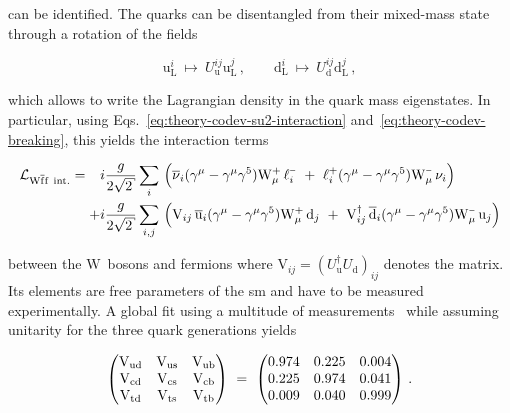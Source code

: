 can be identified. The quarks can be disentangled from their mixed-mass state through a rotation of the fields 

\begin{equation}
\mathrm{u}^{i}_\mathrm{L}~\mapsto~ U^{ij}_\mathrm{u}\mathrm{u}^{j}_\mathrm{L}\,,\qquad \mathrm{d}^{i}_\mathrm{L}~\mapsto~ U^{ij}_\mathrm{d}\mathrm{d}^{j}_\mathrm{L}\,,
\end{equation}

which allows to write the Lagrangian density in the quark mass eigenstates. In particular, using Eqs.~\ref{eq:theory-codev-su2-interaction} and~\ref{eq:theory-codev-breaking}, this yields the interaction terms

\begin{align}
\mathcal{L}_{\mathrm{W}\bar{\mathrm{f}}\mathrm{f}~\mathrm{int.}}=\hphantom{+}i&\frac{g}{2\sqrt{2}}\sum_{i}\,\Big(\bar{\nu}_{i}(\gamma^\mu-\gamma^\mu\gamma^5) \mathrm{W}^{\rmplus}_\mu\,\ell^{\rmminus}_{i}~+~{\ell}^{\rmplus}_{i}(\gamma^\mu-\gamma^\mu\gamma^5) \mathrm{W}^{\rmminus}_\mu\,\nu_{i}\Big)\nonumber\\
+i&\frac{g}{2\sqrt{2}}\sum_{i,j}\,\Big(\mathrm{V}_{ij}\,\bar{\mathrm{u}}_{i}(\gamma^\mu-\gamma^\mu\gamma^5) \mathrm{W}^{\rmplus}_\mu\,\mathrm{d}_{j}~+~\mathrm{V}_{ij}^\dagger\,\bar{\mathrm{d}}_{i}(\gamma^\mu-\gamma^\mu\gamma^5) \mathrm{W}^{\rmminus}_\mu\,\mathrm{u}_{j}\Big) \label{eq:theory-qqW-int}
\end{align}

between the $\mathrm{W}$~bosons and fermions where $\mathrm{V}_{ij}=(U^\dagger_\mathrm{u}U_\mathrm{d})_{ij}$ denotes the  matrix. Its elements are free parameters of the \gls{sm} and have to be measured experimentally. A global fit using a multitude of measurements~\cite{Olive:2016xmw} while assuming unitarity for the three quark generations yields

\begin{equation}
\begin{pmatrix}
{\textrm{V}_\textrm{ud}} & {\textrm{V}_\textrm{us}} & {\textrm{V}_\textrm{ub}} \\
{\textrm{V}_\textrm{cd}} & {\textrm{V}_\textrm{cs}} & {\textrm{V}_\textrm{cb}} \\
{\textrm{V}_\textrm{td}} & {\textrm{V}_\textrm{ts}} & {\textrm{V}_\textrm{tb}} 
\end{pmatrix}
~=~
\begin{pmatrix}
0.974 & 0.225 & 0.004 \\
0.225 & 0.974 & 0.041 \\
0.009 & 0.040 & 0.999 
\end{pmatrix}\,.
\end{equation}


